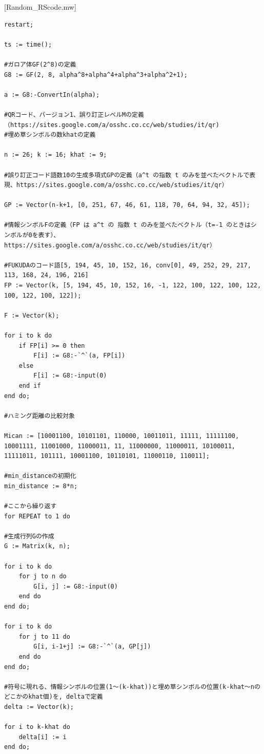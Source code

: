 \documentclass{thesis}
\begin{document}
\newpage

[Random\_RScode.mw]
\begin{lstlisting}
restart;
 
ts := time(); 

#ガロア体GF(2^8)の定義
G8 := GF(2, 8, alpha^8+alpha^4+alpha^3+alpha^2+1); 

a := G8:-ConvertIn(alpha); 

#QRコード、バージョン1、誤り訂正レベルMの定義（https://sites.google.com/a/osshc.co.cc/web/studies/it/qr)
#埋め草シンボルの数khatの定義

n := 26; k := 16; khat := 9; 

#誤り訂正コード語数10の生成多項式GPの定義（a^t の指数 t のみを並べたベクトルで表現、https://sites.google.com/a/osshc.co.cc/web/studies/it/qr）

GP := Vector(n-k+1, [0, 251, 67, 46, 61, 118, 70, 64, 94, 32, 45]); 

#情報シンボルFの定義（FP は a^t の 指数 t のみを並べたベクトル（t=-1 のときはシンボルが0を表す）、https://sites.google.com/a/osshc.co.cc/web/studies/it/qr）

#FUKUDAのコード語[5, 194, 45, 10, 152, 16, conv[0], 49, 252, 29, 217, 113, 168, 24, 196, 216]
FP := Vector(k, [5, 194, 45, 10, 152, 16, -1, 122, 100, 122, 100, 122, 100, 122, 100, 122]); 

F := Vector(k); 

for i to k do 
	if FP[i] >= 0 then 
		F[i] := G8:-`^`(a, FP[i]) 
	else 
		F[i] := G8:-input(0) 
	end if
end do; 

#ハミング距離の比較対象

Mican := [10001100, 10101101, 110000, 10011011, 11111, 11111100, 10001111, 11001000, 11000011, 11, 11000000, 11000011, 10100011, 11111011, 101111, 10001100, 10110101, 11000110, 110011];

#min_distanceの初期化
min_distance := 8*n; 

#ここから繰り返す
for REPEAT to 1 do

#生成行列Gの作成
G := Matrix(k, n); 

for i to k do 
	for j to n do 
		G[i, j] := G8:-input(0) 
	end do 
end do; 

for i to k do 
	for j to 11 do 
		G[i, i-1+j] := G8:-`^`(a, GP[j]) 
	end do 
end do; 

#符号に現れる、情報シンボルの位置(1～(k-khat))と埋め草シンボルの位置(k-khat～nのどこかのkhat個)を, deltaで定義
delta := Vector(k); 

for i to k-khat do
	delta[i] := i 
end do; 


\end{lstlisting}
\end{document}
